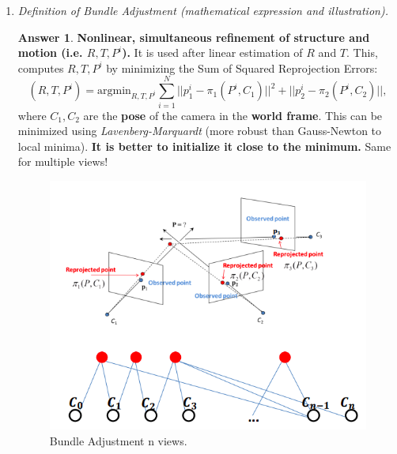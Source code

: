 \documentclass[a4paper,12 pt]{article}
\theoremstyle{definition}
\theoremstyle{remark}
\theoremstyle{definition}
\theoremstyle{definition}
\theoremstyle{definition}
\theoremstyle{definition}
\theoremstyle{remark}
\theoremstyle{remark}
\theoremstyle{definition}
\theoremstyle{definition}
\newtheorem*{answer}{Answer}
\begin{document}
\begin{enumerate}
\item \textit{Definition of Bundle Adjustment (mathematical expression and illustration). }
\begin{answer}
\textbf{Nonlinear, simultaneous refinement of structure and motion (i.e. $R,T,P^i$).} It is used after linear estimation of $R$ and $T$. This, computes $R,T,P^i$ by minimizing the Sum of Squared Reprojection Errors:
\begin{equation}
(R,T,P^i)=\text{argmin}_{R,T,P^i} \sum_{i=1}^N ||p_1^i-\pi_1(P^i,C_1)||^2+||p_2^i-\pi_2(P^i,C_2)||,
\end{equation}
where $C_1,C_2$ are the \textbf{pose} of the camera in the \textbf{world frame}. This can be minimized using \textit{Lavenberg-Marquardt} (more robust than Gauss-Newton to local minima). \textbf{It is better to initialize it close to the minimum.} Same for multiple views!
\begin{figure}[h!]
\begin{center}
\includegraphics[scale=0.4]{pics/BAnview}
\caption{Bundle Adjustment n views. \label{fig:BA}}
\end{center}
\end{figure}
\end{answer}


\end{enumerate}
\end{document}
